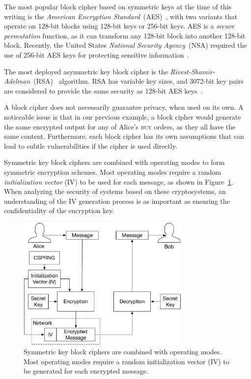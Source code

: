 The most popular block cipher based on symmetric keys at the time of this
writing is the
\textit{American Encryption Standard}~(AES)~\cite{daemen1999aes, fips2001aes},
with two variants that operate on 128-bit blocks using 128-bit keys or 256-bit
keys. AES is a \textit{secure permutation} function, as it can transform any
128-bit block into another 128-bit block. Recently, the United States
\textit{National Security Agency}~(NSA) required the use of 256-bit AES keys
for protecting sensitive information~\cite{nsa2015suiteb}.

The most deployed asymmetric key block cipher is the
\textit{Rivest-Shamir-Adelman}~(RSA)~\cite{rivest1978rsa} algorithm. RSA has
variable key sizes, and 3072-bit key pairs are considered to provide the same
security as 128-bit AES keys~\cite{fips2012keysize}.

A block cipher does not necessarily guarantee privacy, when used  on its own.
A noticeable issue is that in our previous example, a block cipher would
generate the same encrypted output for any of Alice's \textsc{buy} orders, as
they all have the same content. Furthermore, each block cipher has its own
assumptions that can lead to subtle vulnerabilities if the cipher is used
directly.

Symmetric key block ciphers are combined with operating modes to form symmetric
encryption schemes. Most operating modes require a random
\textit{initialization vector} (IV) to be used for each message, as shown in
Figure~\ref{fig:symmetric_encryption}. When analyzing the security of systems
based on these cryptosystems, an understanding of the IV generation process is
as important as ensuring the confidentiality of the encryption key.

\begin{figure}[hbt]
  \centering
  \includegraphics[width=85mm]{figures/symmetric_encryption.pdf}
  \caption{
    Symmetric key block ciphers are combined with operating modes. Most
    operating modes require a random initialization vector (IV) to be generated
    for each encrypted message.
  }
  \label{fig:symmetric_encryption}
\end{figure}

